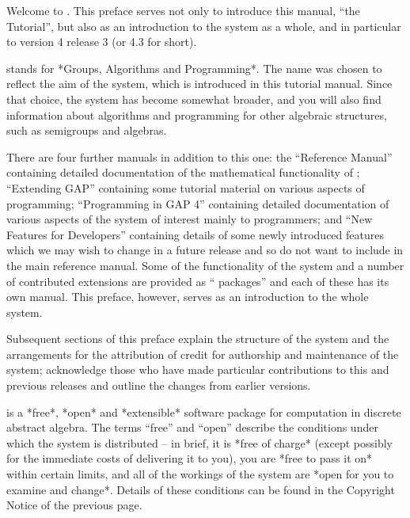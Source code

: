 
Welcome to {\GAP}. This preface serves not only to introduce this
manual, ``the {\GAP} Tutorial'', but also as an introduction to the
system as a whole, and in particular to version 4 release 3 (or {\GAP}
4.3 for short).

{\GAP} stands  for  *Groups, Algorithms  and Programming*.  The  name was
chosen to reflect  the aim of  the  system, which  is introduced in  this
tutorial manual.  Since  that  choice,  the  system has become   somewhat
broader,    and  you will  also   find information   about algorithms and
programming  for other   algebraic structures,   such as semigroups   and
algebras.

There are four further manuals in addition to  this one: the ``Reference
Manual''    containing   detailed  documentation     of  the mathematical
functionality   of {\GAP}; ``Extending   GAP''  containing  some tutorial
material on various aspects  of {\GAP} programming;  ``Programming in
GAP 4'' containing detailed documentation   of various aspects   of the
system of interest mainly to programmers; and ``New Features for
Developers'' containing details of some newly introduced features
which we may wish to change in a future release and so do not want to
include in the main reference manual. Some of the functionality
of the system and a number of contributed extensions are provided as
``{\GAP} packages'' and each of these has its own manual. This
preface, however, serves as an introduction to the whole system.

Subsequent sections of this preface explain the structure of the
system and the arrangements for the attribution of credit for
authorship and maintenance of the system; acknowledge those who have
made particular contributions to this and previous releases and
outline the changes from earlier versions.





{\GAP}  is  a  *free*, *open*  and    *extensible*  software package  for
computation  in  discrete abstract  algebra.    The terms ``free''  and
``open'' describe the conditions under which the system is distributed --
in brief, it is *free of charge* (except possibly for the immediate costs
of delivering it to  you), you are *free  to pass  it on* within  certain
limits,  and all  of the  workings of  the  system are  *open  for you to
examine and   change*. Details of these conditions can be found
in the Copyright Notice of the previous page.

